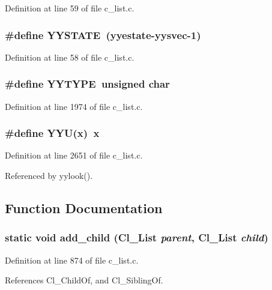 Definition at line 59 of file c\_\-list.c.
\subsubsection{\setlength{\rightskip}{0pt plus 5cm}\#define YYSTATE~(\bf{yyestate}-\bf{yysvec}-1)}\label{c__list_8c_32b5b960944f946b192d54f672569cd9}




Definition at line 58 of file c\_\-list.c.
\subsubsection{\setlength{\rightskip}{0pt plus 5cm}\#define YYTYPE~unsigned char}\label{c__list_8c_f36e924ed81943536b70cc1b4247df25}




Definition at line 1974 of file c\_\-list.c.
\subsubsection{\setlength{\rightskip}{0pt plus 5cm}\#define YYU(x)~x}\label{c__list_8c_94662a60a9be7f490003ed3f6dae26cc}




Definition at line 2651 of file c\_\-list.c.

Referenced by yylook().

\subsection{Function Documentation}
\subsubsection{\setlength{\rightskip}{0pt plus 5cm}static void add\_\-child (\bf{Cl\_\-List} {\em parent}, \bf{Cl\_\-List} {\em child})\hspace{0.3cm}{\tt  [static]}}\label{c__list_8c_eaf2fff5d4ab64dc5adaf330c3839d7c}




Definition at line 874 of file c\_\-list.c.

References Cl\_\-Child\-Of, and Cl\_\-Sibling\-Of.

